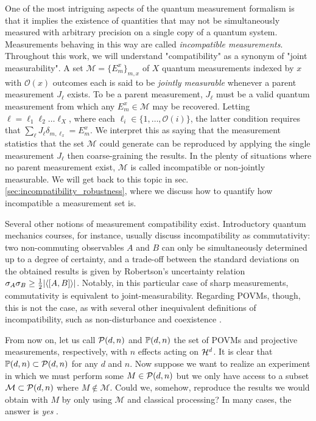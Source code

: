 		One of the most intriguing aspects of the quantum measurement formalism is that it implies the existence of quantities that may not be simultaneously measured with arbitrary precision on a single copy of a quantum system. Measurements behaving in this way are called \emph{incompatible measurements}. Throughout this work, we will understand "compatibility" as a synonym of "joint measurability". A set $\mathcal{M} = \{E_m^x \}_{m, x}$ of $X$ quantum measurements indexed by $x$ with $\mathcal{O}(x)$ outcomes each is said to be \emph{jointly measurable} whenever a parent measurement $J_\ell$ exists. To be a parent measurement, $J_\ell$ must be a valid quantum measurement from which any $E_m^x \in \mathcal{M}$ may be recovered. Letting $\ell = \ell_1\ell_2\ldots\ell_X$, where each $\ell_i \in \{ 1, \ldots, \mathcal{O}(i) \}$, the latter condition requires that $\sum_\ell J_\ell \delta_{m, \ell_x} = E_m^x$. We interpret this as saying that the measurement statistics that the set $\mathcal{M}$ could generate can be reproduced by applying the single measurement $J_\ell$ then coarse-graining the results. In the plenty of situations where no parent measurement exist, $\mathcal{M}$ is called incompatible or non-jointly measurable. We will get back to this topic in sec. \ref{sec:incompatibility_robustness}, where we discuss how to quantify how incompatible a measurement set is.
		
		Several other notions of measurement compatibility exist. Introductory quantum mechanics courses, for instance, usually discuss incompatibility as commutativity: two non-commuting observables $A$ and $B$ can only be simultaneously determined up to a degree of certainty, and a trade-off between the standard deviations on the obtained results is given by Robertson's uncertainty relation $\sigma_A \sigma_B \geq \frac{1}{2} \abs{ \langle \left[ A, B \right] \rangle }$. Notably, in this particular case of sharp measurements, commutativity is equivalent to joint-measurability. Regarding POVMs, though, this is not the case, as with several other inequivalent definitions of incompatibility, such as non-disturbance and coexistence \cite{heinosaari_2016_incompatible}.
		
		From now on, let us call $\mathcal{P}(d,n)$ and $\mathbb{P}(d,n)$ the set of POVMs and projective measurements, respectively, with $n$ effects acting on $\mathcal{H}^{d}$. It is clear that $\mathbb{P}(d,n) \subset \mathcal{P}(d,n)$ for any $d$ and $n$. Now suppose we want to realize an experiment in which we must perform some $M \in \mathcal{P}(d,n)$ but we only have access to a subset $\mathcal{M} \subset \mathcal{P}(d,n)$ where $M \notin \mathcal{M}$. Could we, somehow, reproduce the results we would obtain with $M$ by only using $\mathcal{M}$ and classical processing? In many cases, the answer is \emph{yes} \cite{guerini_tese,guerini_2017_measurementsimulability,haapasalo_2012_measurementsmixing}.
		
